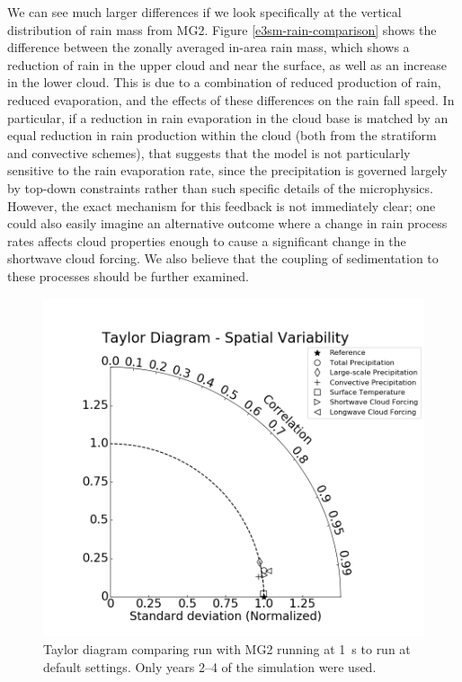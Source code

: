 \documentclass [11pt, proquest] {uwthesis}[2020/02/24]
\begin{document}
We can see much larger differences if we look specifically at the vertical distribution of rain mass from MG2. Figure \ref{e3sm-rain-comparison} shows the difference between the zonally averaged in-area rain mass, which shows a reduction of rain in the upper cloud and near the surface, as well as an increase in the lower cloud. This is due to a combination of reduced production of rain, reduced evaporation, and the effects of these differences on the rain fall speed. In particular, if a reduction in rain evaporation in the cloud base is matched by an equal reduction in rain production within the cloud (both from the stratiform and convective schemes), that suggests that the model is not particularly sensitive to the rain evaporation rate, since the precipitation is governed largely by top-down constraints rather than such specific details of the microphysics. However, the exact mechanism for this feedback is not immediately clear; one could also easily imagine an alternative outcome where a change in rain process rates affects cloud properties enough to cause a significant change in the shortwave cloud forcing. We also believe that the coupling of sedimentation to these processes should be further examined.

\begin{figure}[ht]
  \includegraphics[width=6.5in]{./ANN_metrics_taylor_diag.png}
  \caption{Taylor diagram comparing run with MG2 running at \SI{1}{\second} to run at default settings. Only years \numrange{2}{4} of the simulation were used.}
  \label{e3sm-taylor}
\end{figure}
\end{document}
